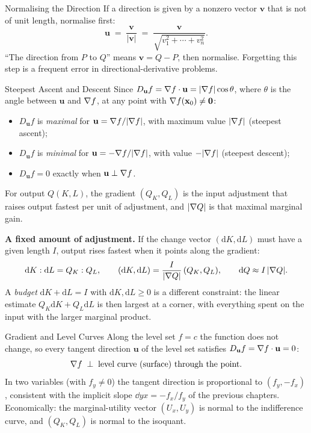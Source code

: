 \begin{rulebox}{Normalising the Direction}
If a direction is given by a nonzero vector $\mathbf{v}$ that is not of
unit length, normalise first:
\[
  \mathbf{u} \;=\; \frac{\mathbf{v}}{|\mathbf{v}|}
  \;=\; \frac{\mathbf{v}}{\sqrt{v_{1}^{2}+\cdots+v_{n}^{2}}} .
\]
``The direction from $P$ to $Q$'' means $\mathbf{v}=Q-P$, then normalise.
Forgetting this step is a frequent error in directional-derivative
problems.
\end{rulebox}

\begin{rulebox}{Steepest Ascent and Descent}
Since $D_{\mathbf{u}}f=\nabla f\cdot\mathbf{u}=|\nabla f|\cos\theta$, where
$\theta$ is the angle between $\mathbf{u}$ and $\nabla f$, at any point
with $\nabla f(\mathbf{x}_{0})\neq\mathbf{0}$:
\begin{itemize}[leftmargin=1.6em,itemsep=0.3ex]
  \item $D_{\mathbf{u}}f$ is \emph{maximal} for
        $\mathbf{u}=\nabla f/|\nabla f|$, with maximum value $|\nabla f|$
        (steepest ascent);
  \item $D_{\mathbf{u}}f$ is \emph{minimal} for
        $\mathbf{u}=-\nabla f/|\nabla f|$, with value $-|\nabla f|$
        (steepest descent);
  \item $D_{\mathbf{u}}f=0$ exactly when $\mathbf{u}\perp\nabla f$.
\end{itemize}
For output $Q(K,L)$, the gradient $(Q_{K},Q_{L})$ is the input adjustment
that raises output fastest per unit of adjustment, and $|\nabla Q|$ is that
maximal marginal gain.

\textbf{A fixed amount of adjustment.} If the change vector
$(\mathrm{d}K,\mathrm{d}L)$ must have a given length $I$, output rises
fastest when it points along the gradient:
\[
  \mathrm{d}K:\mathrm{d}L=Q_{K}:Q_{L},\qquad
  (\mathrm{d}K,\mathrm{d}L)=\frac{I}{|\nabla Q|}\,(Q_{K},Q_{L}),\qquad
  \mathrm{d}Q\approx I\,|\nabla Q| .
\]
A \emph{budget} $\mathrm{d}K+\mathrm{d}L=I$ with $\mathrm{d}K,\mathrm{d}L\ge0$ is
a different constraint: the linear estimate $Q_{K}\mathrm{d}K+Q_{L}\mathrm{d}L$ is then largest at a
corner, with everything spent on the input with the larger marginal
product.
\end{rulebox}

\begin{rulebox}{Gradient and Level Curves}
Along the level set $f=c$ the function does not change, so every tangent
direction $\mathbf{u}$ of the level set satisfies
$D_{\mathbf{u}}f=\nabla f\cdot\mathbf{u}=0$:
\[
  \nabla f \;\perp\; \text{level curve (surface) through the point.}
\]
In two variables (with $f_{y}\neq0$) the tangent direction is proportional
to $(f_{y},-f_{x})$, consistent with the implicit slope
$\dd{y}{x}=-f_{x}/f_{y}$ of the previous chapters. Economically: the
marginal-utility vector $(U_{x},U_{y})$ is normal to the indifference
curve, and $(Q_{K},Q_{L})$ is normal to the isoquant.
\end{rulebox}

